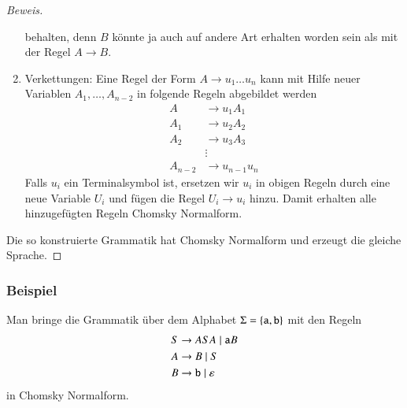 \begin{proof}[Beweis]
\begin{enumerate}
behalten, denn $B$ könnte ja auch auf andere Art erhalten worden
sein als mit der Regel $A\to B$.
\item Verkettungen: Eine Regel der Form $A\to u_1\dots u_n$ kann mit
Hilfe neuer Variablen $A_1,\dots,A_{n-2}$ in folgende Regeln abgebildet
werden
\begin{align*}
A&\to u_1A_1\\
A_1&\to u_2A_2\\
A_2&\to u_3A_3\\
&\vdots\\
A_{n-2}&\to u_{n-1}u_n
\end{align*}
Falls $u_i$ ein Terminalsymbol ist, ersetzen wir $u_i$ in obigen
Regeln durch eine neue Variable $U_i$ und fügen die Regel
$U_i\to u_i$ hinzu. Damit erhalten alle hinzugefügten Regeln
Chomsky Normalform.
\end{enumerate}
Die so konstruierte Grammatik hat Chomsky Normalform und erzeugt die
gleiche Sprache.
\end{proof}

\subsubsection{Beispiel}
Man bringe die Grammatik über dem Alphabet $\Sigma=\{{\tt a},{\tt b}\}$
mit den Regeln
\begin{align*}
S&\to ASA\;|\; {\tt a}B\\
A&\to B\;|\; S\\
B&\to{\tt b}\;|\; \varepsilon
\end{align*}
in Chomsky Normalform.

